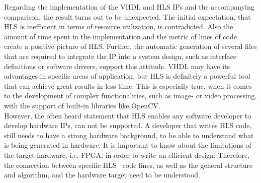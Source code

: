 Regarding the implementation of the VHDL and HLS IPs and the accompanying comparison, the result turns out to be unexpected.
The initial expectation, that HLS is inefficient in terms of resource utilization, is contradicted.
Also the amount of time spent in the implementation and the metric of lines of code create a positive picture of HLS.
Further, the automatic generation of several files that are required to integrate the IP into a system design, such as interface definitions or software drivers, support this attitude.
VHDL may have its advantages in specific areas of application, but HLS is definitely a powerful tool that can achieve great results in less time.
This is especially true, when it comes to the development of complex functionalities, such as image- or video processing, with the support of built-in libraries like OpenCV.\\

However, the often heard statement that HLS enables any software developer to develop hardware IPs, can not be supported.
A developer that writes HLS code, still needs to have a strong hardware background, to be able to understand what is being generated in hardware.
It is important to know about the limitations of the target hardware, i.e. FPGA, in order to write an efficient design.
Therefore, the connection between specific HLS \cplusplus\ code lines, as well as the general structure and algorithm, and the hardware target need to be understood.




%
%
%
%
